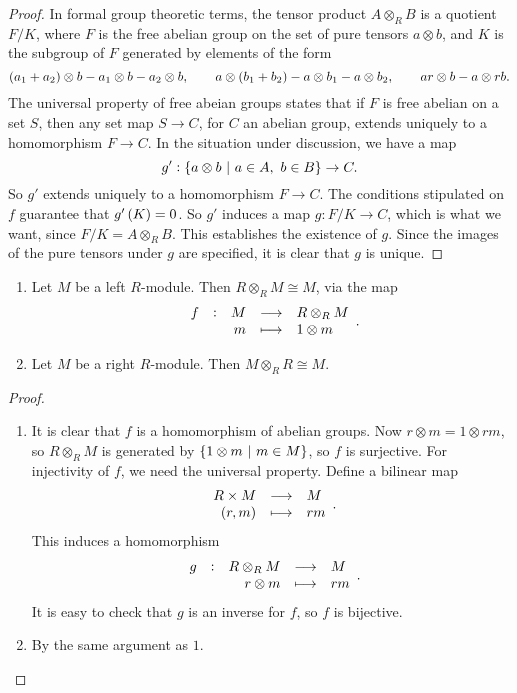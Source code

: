\begin{proof}
In formal group theoretic terms, the tensor product $ A \otimes_R B $ is a quotient $ F / K $, where $ F $ is the free abelian group on the set of pure tensors $ a \otimes b $, and $ K $ is the subgroup of $ F $ generated by elements of the form
$$ \br{a_1 + a_2} \otimes b - a_1 \otimes b - a_2 \otimes b, \qquad a \otimes \br{b_1 + b_2} - a \otimes b_1 - a \otimes b_2, \qquad ar \otimes b - a \otimes rb. $$
The universal property of free abeian groups states that if $ F $ is free abelian on a set $ S $, then any set map $ S \to C $, for $ C $ an abelian group, extends uniquely to a homomorphism $ F \to C $. In the situation under discussion, we have a map
$$ g' : \cbr{a \otimes b \st a \in A, \ b \in B} \to C. $$
So $ g' $ extends uniquely to a homomorphism $ F \to C $. The conditions stipulated on $ f $ guarantee that $ g'\br{K} = 0 $. So $ g' $ induces a map $ g : F / K \to C $, which is what we want, since $ F / K = A \otimes_R B $. This establishes the existence of $ g $. Since the images of the pure tensors under $ g $ are specified, it is clear that $ g $ is unique.
\end{proof}

\begin{corollary}
\hfill
\begin{enumerate}
\item Let $ M $ be a left $ R $-module. Then $ R \otimes_R M \cong M $, via the map
$$ \function[f]{M}{R \otimes_R M}{m}{1 \otimes m}. $$
\item Let $ M $ be a right $ R $-module. Then $ M \otimes_R R \cong M $.
\end{enumerate}
\end{corollary}

\begin{proof}
\hfill
\begin{enumerate}
\item It is clear that $ f $ is a homomorphism of abelian groups. Now $ r \otimes m = 1 \otimes rm $, so $ R \otimes_R M $ is generated by $ \cbr{1 \otimes m \st m \in M} $, so $ f $ is surjective. For injectivity of $ f $, we need the universal property. Define a bilinear map
$$ \function{R \times M}{M}{\br{r, m}}{rm}. $$
This induces a homomorphism
$$ \function[g]{R \otimes_R M}{M}{r \otimes m}{rm}. $$
It is easy to check that $ g $ is an inverse for $ f $, so $ f $ is bijective.
\item By the same argument as $ 1 $.
\end{enumerate}
\end{proof}

